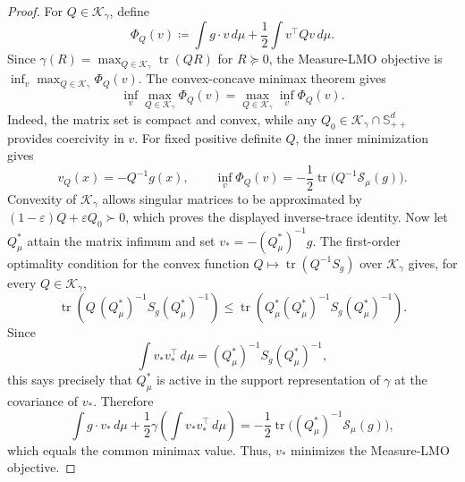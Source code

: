 \documentclass{article}
\newcommand{\tr}{\operatorname{tr}}
\newcommand{\cK}{\mathcal K_\gamma}
\newcommand{\Sppd}{\mathbb S_{++}^d}
\begin{document}
\begin{proof}
For $Q\in\cK$, define
$$
\Phi_Q(v)\coloneqq \int g\cdot v\,d\mu+\frac12\int v^\top Qv\,d\mu.
$$
Since $\gamma(R)=\max_{Q\in\cK}\tr(QR)$ for $R\succeq0$, the Measure-LMO
objective is $\inf_v\max_{Q\in\cK}\Phi_Q(v)$.  The convex-concave minimax
theorem gives
$$
\inf_v\max_{Q\in\cK}\Phi_Q(v)
=
\max_{Q\in\cK}\inf_v\Phi_Q(v).
$$
Indeed, the matrix set is compact and convex, while any
$Q_0\in\cK\cap\Sppd$ provides coercivity in $v$.  For fixed positive definite
$Q$, the inner minimization gives
$$
v_Q(x)=-Q^{-1}g(x),
\qquad
\inf_v\Phi_Q(v)=-\frac12\tr\!\bigl(Q^{-1}\mathcal{S}_\mu(g)\bigr).
$$
Convexity of $\cK$ allows singular matrices to be approximated by
$(1-\varepsilon)Q+\varepsilon Q_0\succ0$, which proves the displayed
inverse-trace identity.  Now let $Q_\mu^*$ attain the matrix infimum and set
$v_*=-(Q_\mu^*)^{-1}g$. The first-order optimality condition
for the convex function $Q\mapsto\tr(Q^{-1}S_g)$ over $\cK$ gives, for every
$Q\in\cK$,
$$
\tr\!\left(Q\,(Q_\mu^*)^{-1}S_g(Q_\mu^*)^{-1}\right)
\le
\tr\!\left(Q_\mu^*(Q_\mu^*)^{-1}S_g(Q_\mu^*)^{-1}\right).
$$
Since
$$
\int v_*v_*^\top\,d\mu=(Q_\mu^*)^{-1}S_g(Q_\mu^*)^{-1},
$$
this says precisely that $Q_\mu^*$ is active in the support representation of
$\gamma$ at the covariance of $v_*$. Therefore
$$
\int g\cdot v_*\,d\mu+\frac12\gamma\!\left(\int v_*v_*^\top\,d\mu\right)
=
-\frac12\tr\!\bigl((Q_\mu^*)^{-1}\mathcal{S}_\mu(g)\bigr),
$$
which equals the common minimax value. Thus, $v_*$ minimizes the Measure-LMO
objective.
\end{proof}
\end{document}
